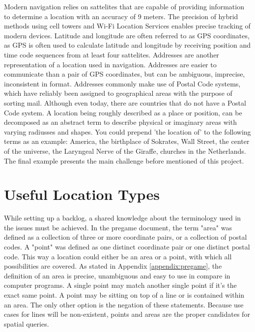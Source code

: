 Modern navigation relies on sattelites that are capable of providing information to determine a location with an accuracy of 9 meters. The precision of hybrid methods using cell towers and Wi-Fi Location Services enables precise tracking of modern devices. Latitude and longitude are often referred to as GPS coordinates, as GPS is often used to calculate latitude and longitude by receiving position and time code sequences from at least four sattelites. Addresses are another representation of a location used in navigation. Addresses are easier to communicate than a pair of GPS coordinates, but can be ambiguous, imprecise, inconsistent in format. Addresses commonly make use of Postal Code systems, which have reliably been assigned to geographical areas with the purpose of sorting mail. Although even today, there are countries that do not have a Postal Code system.
A location being roughly described as a place or position, can be decomposed as an abstract term to describe physical or imaginary areas with varying radiusses and shapes. You could prepend 'the location of' to the following terms as an example: America, the birthplace of Sokrates, Wall Street, the center of the universe, the Laryngeal Nerve of the Giraffe, churches in the Netherlands. The final example presents the main challenge before mentioned of this project.

%
\section{Useful Location Types}
While setting up a backlog, a shared knowledge about the terminology used in the issues must be achieved. In the pregame document, the term "area" was defined as a collection of three or more coordinate pairs, or a collection of postal codes. A "point" was defined as one distinct coordinate pair or one distinct postal code. This way a location could either be an area or a point, with which all possibilities are covered. As stated in Appendix \ref{appendix:pregame}, the definition of an area is precise, unambiguous and easy to use in compare in computer programs. A single point may match another single point if it’s the exact same point. A point may be sitting on top of a line or is contained within an area. The only other option is the negation of these statements. Because use cases for lines will be non-existent, points and areas are the proper candidates for spatial queries.

